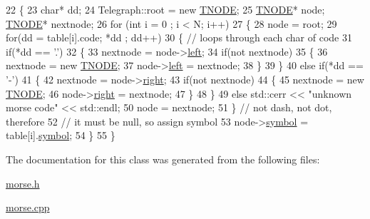 \begin{DoxyCode}
22 \{
23     \textcolor{keywordtype}{char}* dd;
24     Telegraph::root = \textcolor{keyword}{new} \hyperlink{structTNODE}{TNODE};
25     \hyperlink{structTNODE}{TNODE}* node; \hyperlink{structTNODE}{TNODE}* nextnode;
26     \textcolor{keywordflow}{for} (\textcolor{keywordtype}{int} i = 0 ; i < N; i++)
27     \{
28         node = root;
29         \textcolor{keywordflow}{for}(dd = table[i].code; *dd ; dd++)
30         \{   \textcolor{comment}{// loops through each char of code}
31             \textcolor{keywordflow}{if}(*dd == \textcolor{charliteral}{'.'})
32             \{
33                 nextnode = node->\hyperlink{structTNODE_ac8548d0ee2d54b914e0e07ab35375dba}{left};
34                 \textcolor{keywordflow}{if}(not nextnode)
35                 \{ 
36                     nextnode = \textcolor{keyword}{new} \hyperlink{structTNODE}{TNODE};
37                     node->\hyperlink{structTNODE_ac8548d0ee2d54b914e0e07ab35375dba}{left} = nextnode;
38                 \}
39             \}
40             \textcolor{keywordflow}{else} \textcolor{keywordflow}{if}(*dd == \textcolor{charliteral}{'-'})
41             \{
42                 nextnode = node->\hyperlink{structTNODE_a4e135d9137519b2a4b89dbccb55ae967}{right};
43                 \textcolor{keywordflow}{if}(not nextnode)
44                 \{ 
45                     nextnode = \textcolor{keyword}{new} \hyperlink{structTNODE}{TNODE};
46                     node->\hyperlink{structTNODE_a4e135d9137519b2a4b89dbccb55ae967}{right} = nextnode;
47                 \}
48             \}
49             \textcolor{keywordflow}{else} std::cerr << \textcolor{stringliteral}{"unknown morse code"} << std::endl;
50             node = nextnode;
51         \}   \textcolor{comment}{// not dash, not dot, therefore }
52         \textcolor{comment}{// it must be null, so assign symbol}
53         node->\hyperlink{structTNODE_a436db20d992c4227b8482603b4f76712}{symbol} = table[i].\hyperlink{structMorsecode_a8f7fb86f9de77dc705dc37730e83869b}{symbol};
54     \}
55 \}
\end{DoxyCode}


The documentation for this class was generated from the following files\+:\begin{DoxyCompactItemize}
\item 
\hyperlink{morse_8h}{morse.\+h}\item 
\hyperlink{morse_8cpp}{morse.\+cpp}\end{DoxyCompactItemize}
